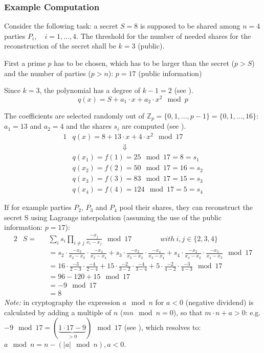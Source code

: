 \subsubsection*{Example Computation} \label{Example Computation}

Consider the following task: a secret $S=8$ is supposed to be shared among $n=4$ parties $P_i,\quad i=1,...,4$. The threshold for the number of needed shares for the reconstruction of the secret shall be $k=3$ (public).

First a prime $p$ has to be chosen, which has to be larger than the secret ($p>S$) and the number of parties ($p>n$): $p=17$ (public information)

Since $k=3$, the polynomial has a degree of $k-1=2$ (see ).
\begin{equation}
\label{eq:SSS example polynomial}
q(x) = S + a_1 \cdot x + a_2 \cdot x^2 \mod p
\end{equation}

The coefficients are selected randomly out of $\mathbb{Z}_p=\{0,1,...,p-1\}=\{0,1,...,16\}$: $a_1=13$ and $a_2=4$ and the shares $s_i$ are computed (see ).
\begin{alignat}{1}
& q(x) = 8 + 13 \cdot x + 4 \cdot x^2 \mod 17 \label{eq:SSS example polynomial specific} \\
&\qquad \qquad \qquad \quad \Downarrow \nonumber \\ 
& q(x_1)=f(1)=25\mod17=8=s_1 \nonumber \\
& q(x_2)=f(2)=50\mod17=16=s_2 \nonumber \\
& q(x_3)=f(3)=83\mod17=15=s_3 \nonumber \\
& q(x_4)=f(4)=124\mod17=5=s_4 \nonumber 
\end{alignat}

If for example parties $P_2$, $P_3$ and $P_4$ pool their shares, they can reconstruct the secret S using Lagrange interpolation (assuming the use of the public information: $p=17$):
\begin{alignat}{2}
& S = && \sum_i s_i \prod_{i \neq j} \frac{-x_j}{x_i - x_j } \mod 17 \qquad \qquad  with \ i,j \in \{2,3,4\} \\
& \quad && =s_2 \cdot \frac{-x_3}{x_2-x_3} \cdot \frac{-x_4}{x_2-x_4} + s_3 \cdot \frac{-x_2}{x_3-x_2} \cdot \frac{-x_4}{x_3-x_4} + s_4 \cdot \frac{-x_2}{x_4-x_2} \cdot \frac{-x_3}{x_4-x_3} \mod 17 \nonumber \\
& \quad && =16 \cdot \frac{-3}{2-3} \cdot \frac{-4}{2-4} + 15 \cdot \frac{-2}{3-2} \cdot \frac{-4}{3-4} + 5 \cdot \frac{-2}{4-2} \cdot \frac{-3}{4-3} \mod 17  \nonumber \\
& \quad && = 96-120+15 \mod 17 \nonumber \\
& \quad && = -9 \mod 17 \label{eq:SSS example negative modulo} \\
& \quad && = 8 \nonumber 
\end{alignat}
\textit{Note:} in cryptography the expression $a \mod n$ for $a<0$ (negative dividend) is calculated by adding a multiple of  $n$ ($mn\mod n=0$), so that $m \cdot n+a>0$: e.g. $-9 \mod 17 = (\underbrace{1 \cdot 17-9}_{>0}) \mod 17$ (see ), which resolves to: $a\mod n = n-(|a|\mod n), a<0$.

